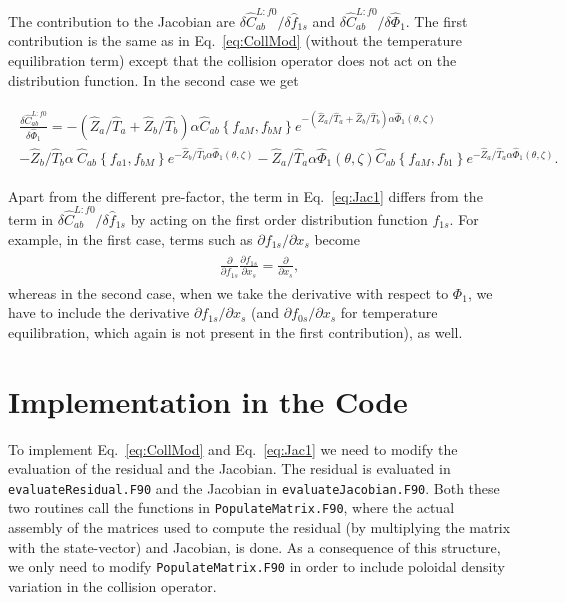 \documentclass[12pt]{article}
\newcommand{\eq}[1]{\begin{align*}\begin{gathered}#1\end{gathered}\end{align*}}
\newcommand{\eqre}[1]{\begin{align}\begin{gathered}#1\end{gathered}\end{align}}
\begin{document}
The contribution to the Jacobian are $\delta \hat C_{ab}^{L:f0}/\delta \hat f_{1s}$ and $\delta \hat C_{ab}^{L:f0}/\delta\hat \Phi_1$. The first contribution is the same as in Eq.~\eqref{eq:CollMod} (without the temperature equilibration term) except that the collision operator does not act on the distribution function. In the second case we get 

\eqre{
\label{eq:Jac1}
\frac{\delta \hat C_{ab}^{L:f0}}{\delta \hat \Phi_1} = -\left(\hat Z_a/\hat T_a + \hat Z_b/\hat T_b\right) \alpha \hat C_{ab}\left\{f_{aM},f_{bM}\right\}e^{-\left(\hat Z_a/\hat T_a + \hat Z_b/\hat T_b\right) \alpha\hat\Phi_1(\theta,\zeta)}  \\ -\hat Z_b/\hat T_b \alpha\ \hat C_{ab}\left\{f_{a1},f_{bM}\right\}e^{-\hat Z_b/\hat T_b \alpha\hat\Phi_1(\theta,\zeta)}  - \hat Z_a/\hat T_a\alpha\hat\Phi_1(\theta,\zeta) \hat C_{ab}\left\{f_{aM},f_{b1}\right\}e^{-\hat Z_a/\hat T_a\alpha\hat\Phi_1(\theta,\zeta)}.
}

\noindent
Apart from the different pre-factor, the term in Eq.~\eqref{eq:Jac1} differs from the term in $\delta \hat C_{ab}^{L:f0}/\delta \hat f_{1s}$ by acting on the first order distribution function $f_{1s}$. For example, in the first case, terms such as $\partial f_{1s}/\partial x_s$ become 
\eq{
\frac{\partial}{\partial f_{1s}}\frac{\partial f_{1s}}{\partial x_s} = \frac{\partial}{\partial x_s},
}
whereas in the second case, when we take the derivative with respect to $\Phi_1$, we have to include the derivative $\partial f_{1s}/\partial x_s$ (and $\partial f_{0s}/\partial x_s$ for temperature equilibration, which again is not present in the first contribution), as well.


\section*{Implementation in the Code}
To implement Eq.~\eqref{eq:CollMod} and Eq.~\eqref{eq:Jac1} we need to modify the evaluation of the residual and the Jacobian. The residual is evaluated in \texttt{evaluateResidual.F90} and the Jacobian in \texttt{evaluateJacobian.F90}. Both these two routines call the functions in \texttt{PopulateMatrix.F90}, where the actual assembly of the matrices used to compute the residual (by multiplying the matrix with the state-vector) and Jacobian, is done. As a consequence of this structure, we only need to modify \texttt{PopulateMatrix.F90} in order to include poloidal density variation in the collision operator.
\end{document}
